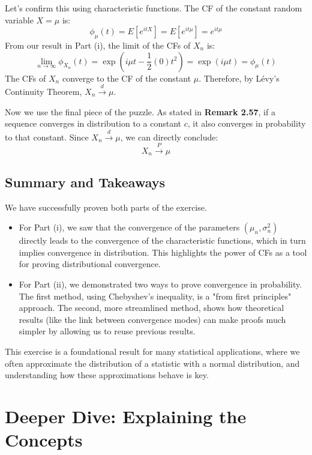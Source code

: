 \documentclass[11pt,a4paper]{article}
\begin{document}
Let's confirm this using characteristic functions. The CF of the constant random variable $X=\mu$ is:
\[ \phi_\mu(t) = E[e^{itX}] = E[e^{it\mu}] = e^{it\mu} \]
From our result in Part (i), the limit of the CFs of $X_n$ is:
\[ \lim_{n \to \infty} \phi_{X_n}(t) = \exp\left(i\mu t - \frac{1}{2}(0)t^2\right) = \exp(i\mu t) = \phi_\mu(t) \]
The CFs of $X_n$ converge to the CF of the constant $\mu$. Therefore, by Lévy's Continuity Theorem, $X_n \stackrel{d}{\longrightarrow} \mu$.

Now we use the final piece of the puzzle. As stated in \textbf{Remark 2.57}, if a sequence converges in distribution to a constant $c$, it also converges in probability to that constant. Since $X_n \stackrel{d}{\longrightarrow} \mu$, we can directly conclude:
\[ X_n \stackrel{P}{\longrightarrow} \mu \]

\subsection*{Summary and Takeaways}
We have successfully proven both parts of the exercise.
\begin{itemize}
    \item For Part (i), we saw that the convergence of the parameters $(\mu_n, \sigma_n^2)$ directly leads to the convergence of the characteristic functions, which in turn implies convergence in distribution. This highlights the power of CFs as a tool for proving distributional convergence.
    \item For Part (ii), we demonstrated two ways to prove convergence in probability. The first method, using Chebyshev's inequality, is a "from first principles" approach. The second, more streamlined method, shows how theoretical results (like the link between convergence modes) can make proofs much simpler by allowing us to reuse previous results.
\end{itemize}
This exercise is a foundational result for many statistical applications, where we often approximate the distribution of a statistic with a normal distribution, and understanding how these approximations behave is key.

\newpage
\section*{Deeper Dive: Explaining the Concepts}
\end{document}
